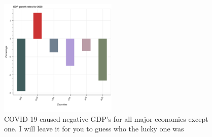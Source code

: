 \documentclass{article}
\begin{document}
\begin{itemize}[nosep , left=0pt , topsep=0pt]
            \begin{figure}[h]
                \centering
                \includegraphics[width=0.5\textwidth]{2020_gdp_growth_rates.png} %
                \captionsetup{skip=0pt,font=small} %
                    \caption{COVID-19 caused negative GDP's for all major economies except one. I will leave it for you to guess who the lucky one was}
                \label{fig:example}
            \end{figure}

            
    \end{itemize} 
\end{document}
